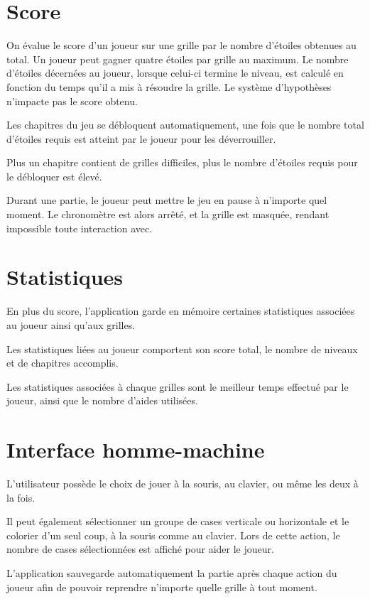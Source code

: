 \documentclass[a4paper, 12pt]{report}
\begin{document}
		\section{Score}
		
			On évalue le score d'un joueur sur une grille par le nombre d'étoiles obtenues au total. Un joueur peut gagner quatre étoiles par grille au maximum. Le nombre d'étoiles décernées au joueur, lorsque celui-ci termine le niveau, est calculé en fonction du temps qu'il a mis à résoudre la grille. Le système d'hypothèses n'impacte pas le score obtenu. 
			
			Les chapitres du jeu se débloquent automatiquement, une fois que le nombre total d'étoiles requis est atteint par le joueur pour les déverrouiller.
			
			Plus un chapitre contient de grilles difficiles, plus le nombre d'étoiles requis pour le débloquer est élevé.
			
			Durant une partie, le joueur peut mettre le jeu en pause à n'importe quel moment. Le chronomètre est alors arrêté, et la grille est masquée, rendant impossible toute interaction avec.

		\section{Statistiques}
		
			En plus du score, l'application garde en mémoire certaines statistiques associées au joueur ainsi qu'aux grilles. 
			
			Les statistiques liées au joueur comportent son score total, le nombre de niveaux et de chapitres accomplis. 
		
			Les statistiques associées à chaque grilles sont le meilleur temps effectué par le joueur, ainsi que le nombre d'aides utilisées.

		\section{Interface homme-machine}
		
			L'utilisateur possède le choix de jouer à la souris, au clavier, ou même les deux à la fois.
			
			Il peut également sélectionner un groupe de cases verticale ou horizontale et le colorier d'un seul coup, à la souris comme au clavier. Lors de cette action, le nombre de cases sélectionnées est affiché pour aider le joueur. 
			
			L'application sauvegarde automatiquement la partie après chaque action du joueur afin de pouvoir reprendre n'importe quelle grille à tout moment.
			
\end{document}
